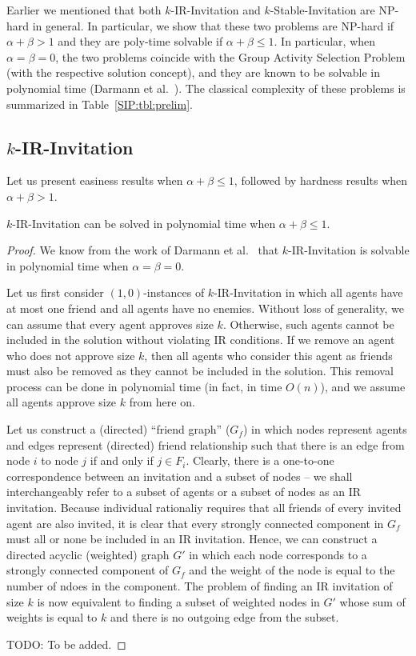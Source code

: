Earlier we mentioned that both $k$-IR-Invitation and $k$-Stable-Invitation are NP-hard in general. In particular, we show that these two problems are NP-hard if $\alpha + \beta > 1$ and they are poly-time solvable if $\alpha + \beta \leq 1$. In particular, when $\alpha = \beta = 0$, the two problems coincide with the Group Activity Selection Problem (with the respective solution concept), and they are known to be solvable in polynomial time (Darmann et al.~\cite{GASP12WINE}). The classical complexity of these problems is summarized in Table~\ref{SIP:tbl:prelim}. 

\subsection{$k$-IR-Invitation}

Let us present easiness results when $\alpha + \beta \leq 1$, followed by hardness results when $\alpha + \beta > 1$. 

\begin{theorem} \label{SIP:thm:IR_invitation_P}
	$k$-IR-Invitation can be solved in polynomial time when $\alpha + \beta \leq 1$.
\end{theorem} 
\begin{proof}
We know from the work of Darmann et al.~\cite{GASP12WINE} that $k$-IR-Invitation is solvable in polynomial time when $\alpha = \beta = 0$.
	
	Let us first consider $(1, 0)$-instances of $k$-IR-Invitation in which all agents have at most one friend and all agents have no enemies. Without loss of generality, we can assume that every agent approves size $k$. Otherwise, such agents cannot be included in the solution without violating IR conditions. If we remove an agent who does not approve size $k$, then all agents who consider this agent as friends must also be removed as they cannot be included in the solution. This removal process can be done in polynomial time (in fact, in time $O(n)$), and we assume all agents approve size $k$ from here on. 
	
	Let us construct a (directed) ``friend graph'' ($G_f$) in which nodes represent agents and edges represent (directed) friend relationship such that there is an edge from node $i$ to node $j$ if and only if $j \in F_i$. Clearly, there is a one-to-one correspondence between an invitation and a subset of nodes -- we shall interchangeably refer to a subset of agents or a subset of nodes as an IR invitation. Because individual rationaliy requires that all friends of every invited agent are also invited, it is clear that every strongly connected component in $G_f$ must all or none be included in an IR invitation. Hence, we can construct a directed acyclic (weighted) graph $G'$ in which each node corresponds to a strongly connected component of $G_f$ and the weight of the node is equal to the number of ndoes in the component. The problem of finding an IR invitation of size $k$ is now equivalent to finding a subset of weighted nodes in $G'$ whose sum of weights is equal to $k$ and there is no outgoing edge from the subset. 

TODO: To be added.
\end{proof}





